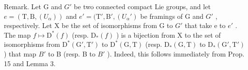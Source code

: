 Remark. Let G and \(G'\) be two connected compact Lie groups, and let \(e = (\mathrm{T}, \mathrm{B}, (U_{\alpha}))\) and \(e' = (\mathrm{T}', \mathrm{B}', (U_{\alpha}')\) be framings of G and \(G'\) , respectively. Let X be the set of isomorphisms from G to \(G'\) that take e to \(e'\) . The map \(f \mapsto \mathrm{D}^{*}(f)\) (resp. \(\mathrm{D}_{*}(f)\) ) is a bijection from X to the set of isomorphisms from \(\mathrm{D}^{*}(\mathrm{G}', \mathrm{T}')\) to \(\mathrm{D}^{*}(\mathrm{G}, \mathrm{T})\) (resp. \(\mathrm{D}_{*}(\mathrm{G}, \mathrm{T})\) to \(\mathrm{D}_{*}(\mathrm{G}', \mathrm{T}')\) ) that map \(B'\) to B (resp. B to \(B'\) ). Indeed, this follows immediately from Prop. 15 and Lemma 3.

